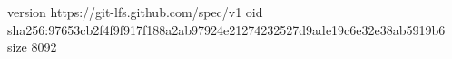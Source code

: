 version https://git-lfs.github.com/spec/v1
oid sha256:97653cb2f4f9f917f188a2ab97924e21274232527d9ade19c6e32e38ab5919b6
size 8092
